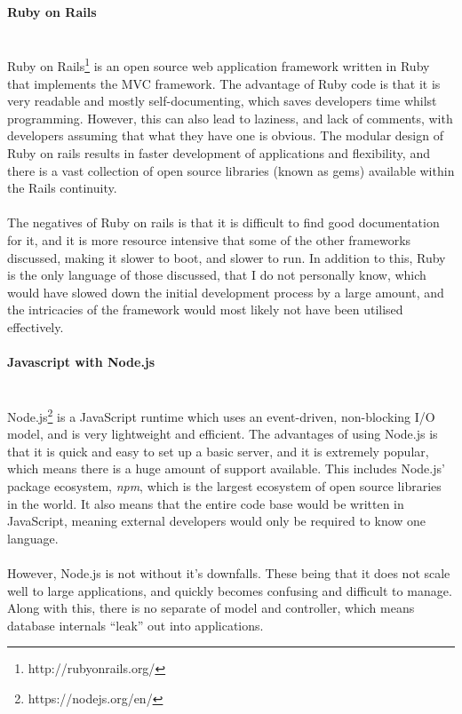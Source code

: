 \paragraph{Ruby on Rails}\ \\
Ruby on Rails\footnote{http://rubyonrails.org/} is an open source web application framework written in Ruby that implements the MVC framework. The advantage of Ruby code is that it is very readable and mostly self-documenting, which saves developers time whilst programming. However, this can also lead to laziness, and lack of comments, with developers assuming that what they have one is obvious. The modular design of Ruby on rails results in faster development of applications and flexibility, and there is a vast collection of open source libraries (known as gems) available within the Rails continuity.\ \\
\ \\
The negatives of Ruby on rails is that it is difficult to find good documentation for it, and it is more resource intensive that some of the other frameworks discussed, making it slower to boot, and slower to run. In addition to this, Ruby is the only language of those discussed, that I do not personally know, which would have slowed down the initial development process by a large amount, and the intricacies of the framework would most likely not have been utilised effectively.

\paragraph{Javascript with Node.js}\ \\
Node.js\footnote{https://nodejs.org/en/} is a JavaScript runtime which uses an event-driven, non-blocking I/O model, and is very lightweight and efficient. The advantages of using Node.js is that it is quick and easy to set up a basic server, and it is extremely popular, which means there is a huge amount of support available. This includes Node.js' package ecosystem, \textit{npm}, which is the largest ecosystem of open source libraries in the world. It also means that the entire code base would be written in JavaScript, meaning external developers would only be required to know one language. \ \\
\ \\
However, Node.js is not without it's downfalls. These being that it does not scale well to large applications, and quickly becomes confusing and difficult to manage. Along with this, there is no separate of model and controller, which means database internals ``leak'' out into applications.

